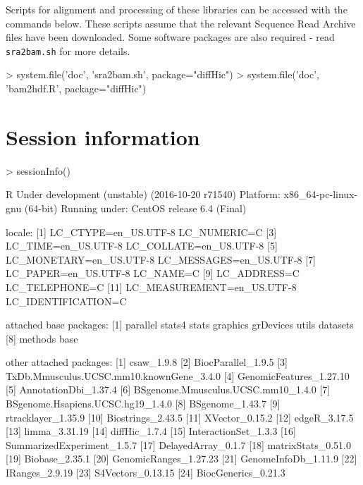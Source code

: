\documentclass[12pt]{report}
\renewenvironment{Schunk}{\vspace{0pt}}{\vspace{0pt}}
\newcommand{\code}[1]{{\small\texttt{#1}}}
\begin{document}
Scripts for alignment and processing of these libraries can be accessed with the commands below.
These scripts assume that the relevant Sequence Read Archive files have been downloaded.
Some software packages are also required - read \code{sra2bam.sh} for more details.

\begin{Schunk}
\begin{Sinput}
> system.file('doc', 'sra2bam.sh', package="diffHic")
> system.file('doc', 'bam2hdf.R', package="diffHic")
\end{Sinput}
\end{Schunk}

\section{Session information}
\begin{Schunk}
\begin{Sinput}
> sessionInfo()
\end{Sinput}
\begin{Soutput}
R Under development (unstable) (2016-10-20 r71540)
Platform: x86_64-pc-linux-gnu (64-bit)
Running under: CentOS release 6.4 (Final)

locale:
 [1] LC_CTYPE=en_US.UTF-8       LC_NUMERIC=C              
 [3] LC_TIME=en_US.UTF-8        LC_COLLATE=en_US.UTF-8    
 [5] LC_MONETARY=en_US.UTF-8    LC_MESSAGES=en_US.UTF-8   
 [7] LC_PAPER=en_US.UTF-8       LC_NAME=C                 
 [9] LC_ADDRESS=C               LC_TELEPHONE=C            
[11] LC_MEASUREMENT=en_US.UTF-8 LC_IDENTIFICATION=C       

attached base packages:
[1] parallel  stats4    stats     graphics  grDevices utils     datasets 
[8] methods   base     

other attached packages:
 [1] csaw_1.9.8                              
 [2] BiocParallel_1.9.5                      
 [3] TxDb.Mmusculus.UCSC.mm10.knownGene_3.4.0
 [4] GenomicFeatures_1.27.10                 
 [5] AnnotationDbi_1.37.4                    
 [6] BSgenome.Mmusculus.UCSC.mm10_1.4.0      
 [7] BSgenome.Hsapiens.UCSC.hg19_1.4.0       
 [8] BSgenome_1.43.7                         
 [9] rtracklayer_1.35.9                      
[10] Biostrings_2.43.5                       
[11] XVector_0.15.2                          
[12] edgeR_3.17.5                            
[13] limma_3.31.19                           
[14] diffHic_1.7.4                           
[15] InteractionSet_1.3.3                    
[16] SummarizedExperiment_1.5.7              
[17] DelayedArray_0.1.7                      
[18] matrixStats_0.51.0                      
[19] Biobase_2.35.1                          
[20] GenomicRanges_1.27.23                   
[21] GenomeInfoDb_1.11.9                     
[22] IRanges_2.9.19                          
[23] S4Vectors_0.13.15                       
[24] BiocGenerics_0.21.3                     


\end{Soutput}
\end{Schunk}
\end{document}
